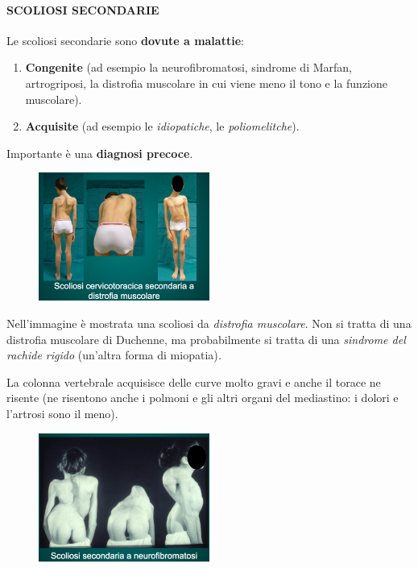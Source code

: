 \paragraph{SCOLIOSI SECONDARIE }


Le scoliosi secondarie sono \textbf{dovute a malattie}:

\begin{enumerate}
\def\labelenumi{\arabic{enumi}.}
\item
  \textbf{Congenite} (ad esempio la neurofibromatosi, sindrome di
  Marfan, artrogriposi, la distrofia muscolare in cui viene meno il tono
  e la funzione muscolare).
\item
  \textbf{Acquisite} (ad esempio le \emph{\emph{idiopatiche}}, le
  \emph{poliomelitche}).
\end{enumerate}

Importante è una \textbf{diagnosi precoce}.

\begin{figure}[!ht]
\centering
	\includegraphics[width=0.5\textwidth]{012/image11.png}
\end{figure}
Nell'immagine è mostrata una scoliosi da \emph{distrofia muscolare}. Non si tratta di
una distrofia muscolare di Duchenne, ma probabilmente si tratta di una
\emph{sindrome del rachide rigido} (un'altra forma di miopatia)\emph{.}

La colonna vertebrale acquisisce delle curve molto gravi e anche il
torace ne risente (ne risentono anche i polmoni e gli altri organi del
mediastino: i dolori e l'artrosi sono il meno).

\begin{figure}[!ht]
\centering
	\includegraphics[width=0.5\textwidth]{012/image12.png}
\end{figure}

